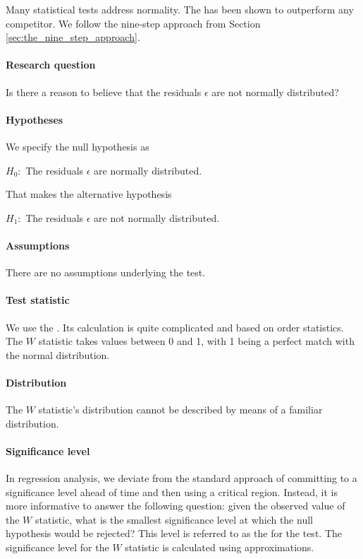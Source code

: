 Many statistical tests address normality. The  has been shown to outperform any competitor. We follow the nine-step approach from Section \ref{sec:the_nine_step_approach}.

\paragraph{Research question} Is there a reason to believe that the residuals $\epsilon$ are not normally distributed?


\paragraph{Hypotheses} We specify the null hypothesis as


$H_0 : $ The residuals $\epsilon$ are normally distributed.

\bigskip
\noindent That makes the alternative hypothesis

$H_1 : $ The residuals $\epsilon$ are not normally distributed.


\paragraph{Assumptions} There are no assumptions underlying the test.

\paragraph{Test statistic} We use the . 
Its calculation is quite complicated and based on order statistics. The $W$ statistic takes values between 0 and 1, with 1 being a perfect match with the normal distribution. 

\paragraph{Distribution} The $W$ statistic's distribution cannot be described by means of a familiar distribution.

\paragraph{Significance level} In regression analysis, we deviate from the standard approach of committing to a significance level ahead of time and then using a critical region. Instead, it is more informative to answer the following question: given the observed value of the $W$ statistic, what is the smallest significance level at which the null hypothesis would be rejected? This level is referred to as the  for the test. The significance level for the $W$ statistic is calculated using approximations.

